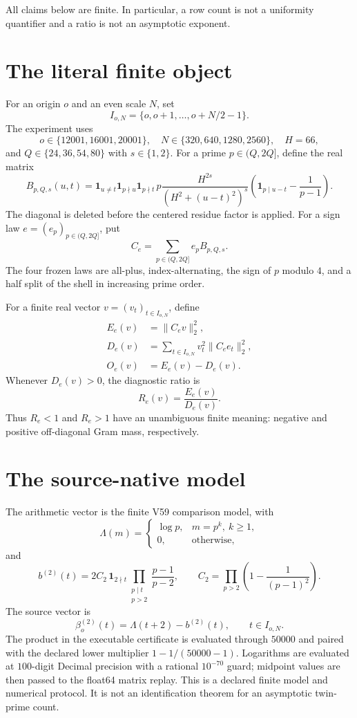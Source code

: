 \documentclass[10pt]{article}
\newcommand{\1}{\mathbf 1}
\begin{document}
All claims below are finite.  In particular, a row count is not a uniformity
quantifier and a ratio is not an asymptotic exponent.

\section{The literal finite object}

For an origin $o$ and an even scale $N$, set
\[
 I_{o,N}=\{o,o+1,\ldots,o+N/2-1\}.
\]
The experiment uses
\[
 o\in\{12001,16001,20001\},\quad
 N\in\{320,640,1280,2560\},\quad H=66,
\]
and $Q\in\{24,36,54,80\}$ with $s\in\{1,2\}$.  For a prime
$p\in(Q,2Q]$, define the real matrix
\begin{equation}\label{eq:block}
 B_{p,Q,s}(u,t)=
 \1_{u\ne t}\1_{p\nmid u}\1_{p\nmid t}\,
 p\frac{H^{2s}}{(H^2+(u-t)^2)^s}
 \left(\1_{p\mid u-t}-\frac1{p-1}\right).
\end{equation}
The diagonal is deleted before the centered residue factor is applied.  For a
sign law $e=(e_p)_{p\in(Q,2Q]}$, put
\[
 C_e=\sum_{p\in(Q,2Q]}e_pB_{p,Q,s}.
\]
The four frozen laws are all-plus, index-alternating, the sign of $p$ modulo
$4$, and a half split of the shell in increasing prime order.

For a finite real vector $v=(v_t)_{t\in I_{o,N}}$, define
\begin{align}
 E_e(v)&=\|C_ev\|_2^2,\\
 D_e(v)&=\sum_{t\in I_{o,N}}v_t^2\|C_ee_t\|_2^2,\\
 O_e(v)&=E_e(v)-D_e(v).
\end{align}
Whenever $D_e(v)>0$, the diagnostic ratio is
\[
 R_e(v)=\frac{E_e(v)}{D_e(v)}.
\]
Thus $R_e<1$ and $R_e>1$ have an unambiguous finite meaning: negative and
positive off-diagonal Gram mass, respectively.

\section{The source-native model}

The arithmetic vector is the finite V59 comparison model, with
\[
 \Lambda(m)=
 \begin{cases}
   \log p,&m=p^k,\ k\geq1,\\
   0,&\text{otherwise},
 \end{cases}
\]
and
\begin{equation}\label{eq:comparison}
 b^{(2)}(t)=2C_2\,\1_{2\nmid t}
 \prod_{\substack{p\mid t\\p>2}}\frac{p-1}{p-2},\qquad
 C_2=\prod_{p>2}\left(1-\frac1{(p-1)^2}\right).
\end{equation}
The source vector is
\[
 \beta_o^{(2)}(t)=\Lambda(t+2)-b^{(2)}(t),
 \qquad t\in I_{o,N}.
\]
The product in the executable certificate is evaluated through $50000$ and
paired with the declared lower multiplier
$1-1/(50000-1)$.  Logarithms are evaluated at $100$-digit Decimal precision
with a rational $10^{-70}$ guard; midpoint values are then passed to the
float64 matrix replay.  This is a declared finite model and numerical
protocol.  It is not an identification theorem for an asymptotic twin-prime
count.
\end{document}
